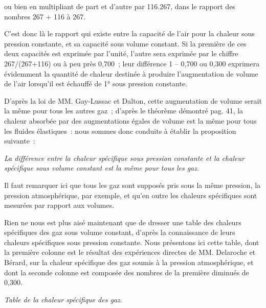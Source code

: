 \documentclass[french,twoside]{book} %
\begin{document}
\noindent ou bien en multipliant de part et d’autre par 116.267, dans le rapport des nombres 267 + 116 à 267.\par
C’est donc là le rapport qui existe entre la capacité de l’air pour la chaleur sous pression constante, et sa capacité sous volume constant. Si la première de ces deux capacités est exprimée par l’unité, l’autre sera exprimée par le chiffre 267/(267+116) ou à peu près 0,700 ; leur différence 1 – 0,700 ou 0,300 exprimera évidemment la quantité de chaleur destinée à produire l’augmentation de volume de l’air lorsqu’il est échauffé de 1° sous pression constante.\par
D’après la loi de MM. Gay-Lussac et Dalton, cette augmentation de volume serait la même pour tous les autres gaz ; d’après le théorème démontré pag. 41, la chaleur absorbée par des augmentations égales de volume est la même pour tous les fluides élastiques : nous sommes donc conduits à établir la proposition suivante :\par
\emph{La différence entre la chaleur spécifique sous pression constante et la chaleur spécifique sous volume constant est la même pour tous les gaz}.\par
Il faut remarquer ici que tous les gaz sont supposés pris sous la même pression, la pression atmosphérique, par exemple, et qu’en outre les chaleurs spécifiques sont mesurées par rapport aux volumes.\par
Rien ne nous est plus aisé maintenant que de dresser une table des chaleurs spécifiques des gaz sous volume constant, d’après la connaissance de leurs chaleurs spécifiques sous pression constante. Nous présentons ici cette table, dont la première colonne est le résultat des expériences directes de MM. Delaroche et Bérard, sur la chaleur spécifique des gaz soumis à la pression atmosphérique, et dont la seconde colonne est composée des nombres de la première diminués de 0,300.\par

\begin{center}
\noindent \emph{Table de la chaleur spécifique des gaz}.\par
\end{center}
\end{document}
